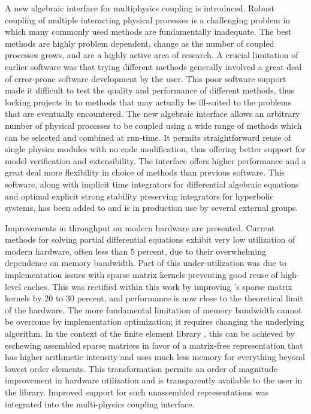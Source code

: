 A new algebraic interface for multiphysics coupling is introduced.
Robust coupling of multiple interacting physical processes is a challenging problem in which many commonly used methods are fundamentally inadequate.
The best methods are highly problem dependent, change as the number of coupled processes grows, and are a highly active area of research.
A crucial limitation of earlier software was that trying different methods generally involved a great deal of error-prone software development by the user.
This poor software support made it difficult to test the quality and performance of different methods, thus locking projects in to methods that may actually be ill-suited to the problems that are eventually encountered.
The new algebraic interface allows an arbitrary number of physical processes to be coupled using a wide range of methods which can be selected and combined at run-time.
It permits straightforward reuse of single physics modules with no code modification, thus offering better support for model verification and extensibility.
The interface offers higher performance and a great deal more flexibility in choice of methods than previous software.
This software, along with implicit time integrators for differential algebraic equations and optimal explicit strong stability preserving integrators for hyperbolic systems, has been added to {\PETSc} and is in production use by several external groups.

Improvements in throughput on modern hardware are presented.
Current methods for solving partial differential equations exhibit very low utilization of modern hardware, often less than 5 percent, due to their overwhelming dependence on memory bandwidth.
Part of this under-utilization was due to implementation issues with sparse matrix kernels preventing good reuse of high-level caches.
This was rectified within this work by improving \PETSc's sparse matrix kernels by 20 to 30 percent, and performance is now close to the theoretical limit of the hardware.
The more fundamental limitation of memory bandwidth cannot be overcome by implementation optimization; it requires changing the underlying algorithm.
In the context of the finite element library \Dohp, this can be achieved by eschewing assembled sparse matrices in favor of a matrix-free representation that has higher arithmetic intensity and uses much less memory for everything beyond lowest order elements.
This transformation permits an order of magnitude improvement in hardware utilization and is transparently available to the user in the {\Dohp} library.
Improved support for such unassembled representations was integrated into the multi-physics coupling interface.

